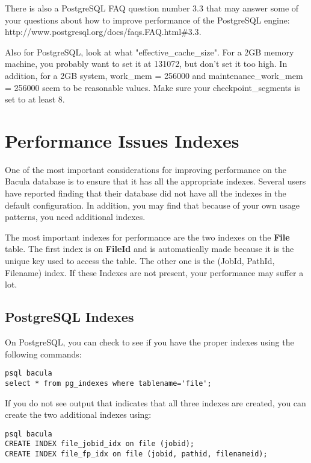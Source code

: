 There is also a PostgreSQL FAQ question number 3.3 that may
answer some of your questions about how to improve performance
of the PostgreSQL engine:
{http://www.postgresql.org/docs/faqs.FAQ.html\#3.3}.

Also for PostgreSQL, look at what "effective\_cache\_size". For a 2GB memory 
machine, you probably want to set it at 131072, but don't set it too high.
In addition, for a 2GB system, work\_mem = 256000 and
maintenance\_work\_mem = 256000 seem to be reasonable values.  Make
sure your checkpoint\_segments is set to at least 8.



\section{Performance Issues Indexes}
One of the most important considerations for improving performance on
the Bacula database is to ensure that it has all the appropriate indexes.
Several users have reported finding that their database did not have
all the indexes in the default configuration.  In addition, you may
find that because of your own usage patterns, you need additional indexes.

The most important indexes for performance are the two indexes on the
{\bf File} table.  The first index is on {\bf FileId} and is automatically
made because it is the unique key used to access the table.  The other
one is the (JobId, PathId, Filename) index.  If these Indexes
are not present, your performance may suffer a lot.

\subsection{PostgreSQL Indexes}
On PostgreSQL, you can check to see if you have the proper indexes using
the following commands:

\footnotesize
\begin{verbatim}
psql bacula
select * from pg_indexes where tablename='file';
\end{verbatim}
\normalsize

If you do not see output that indicates that all three indexes
are created, you can create the two additional indexes using:

\footnotesize
\begin{verbatim}
psql bacula
CREATE INDEX file_jobid_idx on file (jobid);
CREATE INDEX file_fp_idx on file (jobid, pathid, filenameid);
\end{verbatim}
\normalsize

